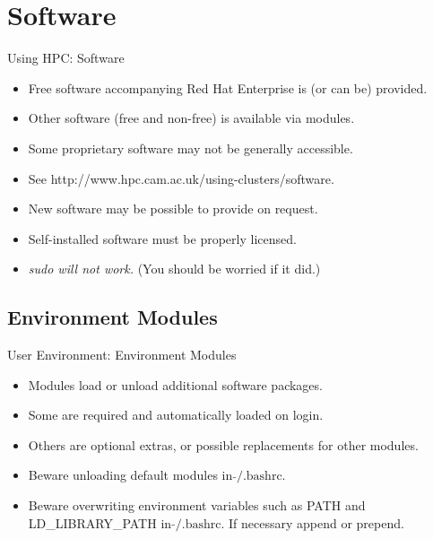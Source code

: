\section{Software}
\begin{frame}{Using HPC: Software}
\begin{itemize}
\item{Free software accompanying \alert{Red Hat Enterprise} is (or can be) provided.}
\item{Other software (free and non-free) is available via \alert{modules}.}
\item{Some proprietary software may not be generally accessible.}
\item{See \alert{http://www.hpc.cam.ac.uk/using-clusters/software}.}
\item{New software may be possible to provide on request.}
\item{\alert{Self-installed software must be properly licensed.}}
  \pause
\item{\color{red}\emph{sudo will not work.}\/ (You should be worried if it did.)}
\end{itemize}
\end{frame}

\subsection{Environment Modules}
\begin{frame}[fragile]{User Environment: Environment Modules}
\begin{itemize}
\item{Modules load or unload additional software packages.}
\item{Some are \alert{required} and automatically loaded on login.}
\item{Others are optional extras, or possible replacements for other modules.}
\item{\alert{Beware} unloading default modules in $\tilde{}\text{/.bashrc}$.}
\item{\alert{Beware} overwriting environment variables such as PATH and LD\_LIBRARY\_PATH in $\tilde{}\text{/.bashrc}$. If necessary append or prepend.}
\end{itemize}
\end{frame}

